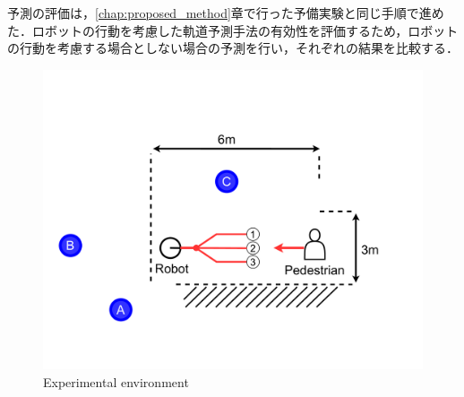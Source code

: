 予測の評価は，\ref{chap:proposed_method}章で行った予備実験と同じ手順で進めた．ロボットの行動を考慮した軌道予測手法の有効性を評価するため，ロボットの行動を考慮する場合としない場合の予測を行い，それぞれの結果を比較する．

\begin{figure}[H]
  \centering
 \includegraphics[keepaspectratio, scale=0.27]
      {images/oculus_experiments.pdf}
\caption{Experimental environment}
 \label{Fig:oculus-exp-overview}
\end{figure} 

